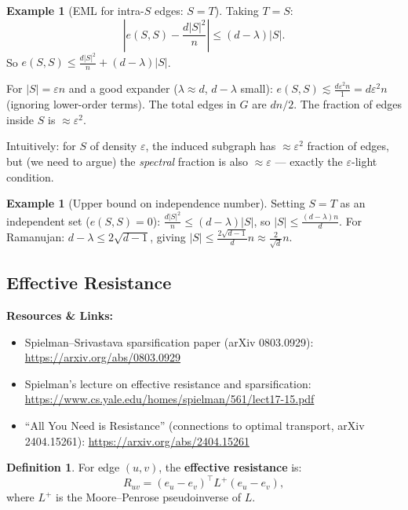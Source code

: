 \documentclass[12pt]{article}
\theoremstyle{definition}
\newtheorem{definition}[theorem]{Definition}
\newtheorem{example}[theorem]{Example}
\theoremstyle{remark}
\newcommand{\resources}[1]{%
  \vspace{4pt}
  \noindent\colorbox{blue!8}{\parbox{\dimexpr\linewidth-2\fboxsep}{%
    \small\textbf{Resources \& Links:} #1}}
  \vspace{4pt}
}
\begin{document}
\begin{example}[EML for intra-$S$ edges: $S = T$]
Taking $T = S$:
\[
  \left|e(S,S) - \frac{d|S|^2}{n}\right| \le (d-\lambda)|S|.
\]
So $e(S,S) \le \frac{d|S|^2}{n} + (d-\lambda)|S|$.

For $|S| = \varepsilon n$ and a good expander ($\lambda \approx d$, $d-\lambda$ small):
$e(S,S) \lesssim \frac{d\varepsilon^2 n}{1} = d\varepsilon^2 n$ (ignoring lower-order terms).
The total edges in $G$ are $dn/2$.  The fraction of edges inside $S$ is $\approx \varepsilon^2$.

Intuitively: for $S$ of density $\varepsilon$, the induced subgraph has $\approx \varepsilon^2$
fraction of edges, but (we need to argue) the \emph{spectral} fraction is also $\approx \varepsilon$
--- exactly the $\varepsilon$-light condition.
\end{example}

\begin{example}[Upper bound on independence number]
Setting $S = T$ as an independent set ($e(S,S) = 0$):
$\frac{d|S|^2}{n} \le (d-\lambda)|S|$, so $|S| \le \frac{(d-\lambda)n}{d}$.
For Ramanujan: $d-\lambda \le 2\sqrt{d-1}$, giving $|S| \le \frac{2\sqrt{d-1}}{d} n \approx
\frac{2}{\sqrt{d}}n$.
\end{example}

\subsection{Effective Resistance}

\resources{
\begin{itemize}\setlength\itemsep{0pt}
  \item Spielman--Srivastava sparsification paper (arXiv 0803.0929):
        \url{https://arxiv.org/abs/0803.0929}
  \item Spielman's lecture on effective resistance and sparsification:
        \url{https://www.cs.yale.edu/homes/spielman/561/lect17-15.pdf}
  \item ``All You Need is Resistance'' (connections to optimal transport, arXiv 2404.15261):
        \url{https://arxiv.org/abs/2404.15261}
\end{itemize}
}

\begin{definition}
For edge $(u,v)$, the \textbf{effective resistance} is:
\[
  R_{uv} = (e_u - e_v)^\top L^+ (e_u - e_v),
\]
where $L^+$ is the Moore--Penrose pseudoinverse of $L$.
\end{definition}
\end{document}
